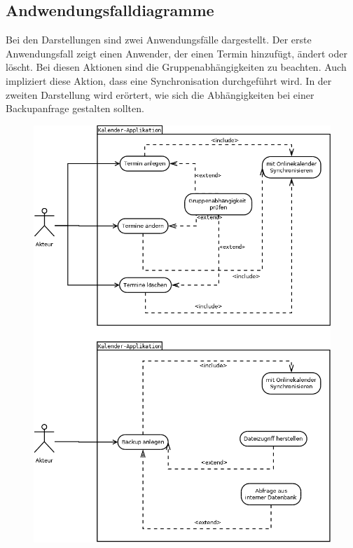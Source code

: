 \documentclass[a4paper]{article}
\begin{document}
  	
  	\subsection{Andwendungsfalldiagramme}
  	Bei den Darstellungen sind zwei Anwendungsfälle dargestellt. Der erste Anwendungsfall zeigt einen Anwender, der einen Termin hinzufügt, ändert oder löscht. Bei diesen Aktionen sind die Gruppenabhängigkeiten zu beachten. Auch impliziert diese Aktion, dass eine Synchronisation durchgeführt wird. In der zweiten Darstellung wird erörtert, wie sich die Abhängigkeiten bei einer Backupanfrage gestalten sollten.
  	\begin{figure}
		\centering
		\includegraphics[width=0.9\linewidth]{Pflichtenheft - Anwendungsfalldiagramm.png}
		\caption{}
		\label{Anwendungsfalldiagramm}
	\end{figure}
\end{document}

